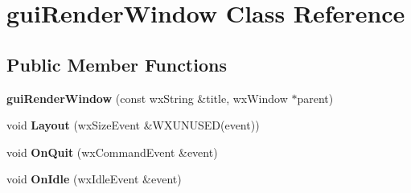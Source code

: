 \hypertarget{classgui_render_window}{
\section{guiRenderWindow Class Reference}
\label{classgui_render_window}
}
\subsection*{Public Member Functions}
\begin{DoxyCompactItemize}
\item 
\hypertarget{classgui_render_window_a73b77dbe4fab3874896d0cd62e68ae8c}{
{\bfseries guiRenderWindow} (const wxString \&title, wxWindow $\ast$parent)}
\label{classgui_render_window_a73b77dbe4fab3874896d0cd62e68ae8c}

\item 
\hypertarget{classgui_render_window_a908c1ba1a1c70a6d99611bd566d3777f}{
void {\bfseries Layout} (wxSizeEvent \&WXUNUSED(event))}
\label{classgui_render_window_a908c1ba1a1c70a6d99611bd566d3777f}

\item 
\hypertarget{classgui_render_window_ae67a9a417355ffcbbbec125ff51a3c87}{
void {\bfseries OnQuit} (wxCommandEvent \&event)}
\label{classgui_render_window_ae67a9a417355ffcbbbec125ff51a3c87}

\item 
\hypertarget{classgui_render_window_a888c4d5e6c048372a5eee3e67c1b72bd}{
void {\bfseries OnIdle} (wxIdleEvent \&event)}
\label{classgui_render_window_a888c4d5e6c048372a5eee3e67c1b72bd}

\end{DoxyCompactItemize}
